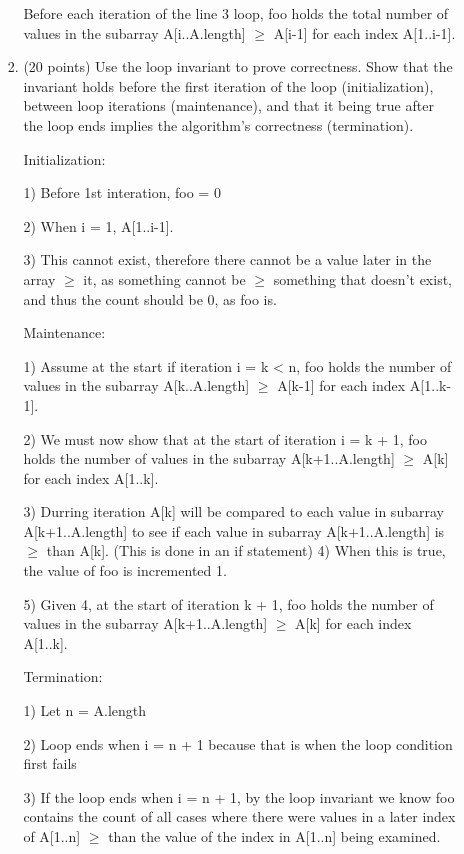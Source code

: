 \documentclass[12pt]{article}
\newenvironment{solution}{}{}
\begin{document}
\begin{enumerate}
\begin{enumerate}
\begin{enumerate}
  \begin{solution}
    Before each iteration of the line 3 loop, foo holds the total number of values in the subarray A[i..A.length] $\geq$ A[i-1] for each index A[1..i-1].
\end{solution}

\item (20 points) Use the loop invariant to prove correctness. Show that the invariant holds before the first iteration of the loop (initialization), between loop iterations (maintenance), and that it being true after the loop ends implies the algorithm's correctness (termination).

  \begin{solution}
    Initialization:
    
    1) Before 1st interation, foo = 0
    
    2) When i = 1, A[1..i-1].
    
    3) This cannot exist, therefore there cannot be a value later in the array $\geq$ it, as something cannot be $\geq$ something that doesn't exist, and thus the count should be 0, as foo is.

    
    Maintenance:
    
    1) Assume at the start if iteration i = k < n, foo holds the number of values in the subarray A[k..A.length] $\geq$ A[k-1] for each index A[1..k-1].
    
    2) We must now show that at the start of iteration i = k + 1, foo holds the number of values in the subarray A[k+1..A.length] $\geq$ A[k] for each index A[1..k].
    
    3) Durring iteration A[k] will be compared to each value in subarray A[k+1..A.length] to see if each value in subarray A[k+1..A.length] is $\geq$ than A[k]. (This is done in an if statement)
    4) When this is true, the value of foo is incremented 1.
    
    5) Given 4, at the start of iteration k + 1, foo holds the number of values in the subarray A[k+1..A.length] $\geq$ A[k] for each index A[1..k].
    

    Termination:
    
    1) Let n = A.length
    
    2) Loop ends when i = n + 1 because that is when the loop condition first fails
    
        3) If the loop ends when i = n + 1, by the loop invariant we know foo contains the count of all cases where there were values in a later index of A[1..n] $\geq$ than the value of the index in A[1..n] being examined.
\end{solution}


\end{enumerate}
\end{enumerate}
\end{enumerate}
\end{document}
